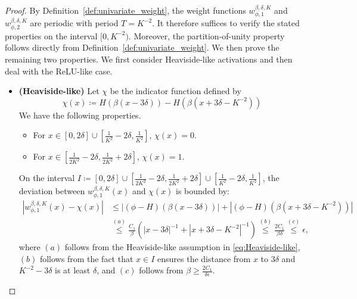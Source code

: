 \documentclass[11pt]{article}
\begin{document}
\begin{proof}
    By Definition~\ref{def:univariate_weight}, the weight functions $w_{\phi,1}^{\beta,\delta,K}$ and $w_{\phi,2}^{\beta,\delta,K}$ are periodic with period $T = K^{-2}$. It therefore suffices to verify the stated properties on the interval $[0,K^{-2})$. Moreover, the partition-of-unity property follows directly from Definition~\ref{def:univariate_weight}. We then prove the remaining two properties. We first consider Heaviside-like activations and then deal with the ReLU-like case.
    \begin{itemize}
        \item \textbf{(Heaviside-like)} Let $\chi$ be the indicator function defined by
        \begin{equation*}
            \chi(x)\coloneqq H(\beta(x - 3\delta)) - H(\beta(x + 3 \delta - K^{-2}))
        \end{equation*}
        We have the following properties.
        \begin{itemize}
            \item For $x \in [0,2\delta] \cup [\frac{1}{K^2}-2\delta,\frac{1}{K^2}]$, $\chi(x) = 0$.
            \item For $x \in [\frac{1}{2K^2} - 2\delta, \frac{1}{2K^2} + 2 \delta]$, $\chi(x) = 1$.
        \end{itemize}
        On the interval $ I\coloneqq [0, 2\delta] \cup [\frac{1}{2K^2}- 2\delta, \frac{1}{2K^2} + 2 \delta]\cup [\frac{1}{K^2} - 2\delta, \frac{1}{K^2}]$,  the deviation between $w_{\phi,1}^{\beta,\delta,K}(x)$ and $\chi(x)$ is bounded by:
        \begin{equation*}
            \begin{aligned}
                |w_{\phi,1}^{\beta,\delta, K}(x) -\chi(x)| & \leq \left| (\phi -H)(\beta (x - 3 \delta)) \right| + |(\phi - H)(\beta (x + 3 \delta - K^{-2}) )| \\
                & \overset{(a)}{\leq} \frac{C_1}{ \beta}\left( {|x - 3 \delta|}^{-1} + {|x + 3\delta - K^{-2}|}^{-1}\right)  \overset{(b)}{\leq}\frac{2C_1}{\beta \delta} \overset{(c)}{\leq} \epsilon,
            \end{aligned}
        \end{equation*}
        where $(a)$ follows from the Heaviside-like assumption in \eqref{eq:Heaviside-like}, $(b)$ follows from the fact that $x \in I$ ensures the distance from $x$ to $3 \delta$ and $K^{-2}- 3\delta$ is at least $\delta$, and $(c)$ follows from $\beta \geq \frac{2 C_1}{\delta \epsilon}$.



\end{itemize}
\end{proof}
\end{document}
